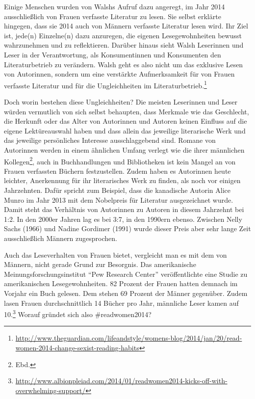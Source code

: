 \documentclass[a4paper,
fontsize=11pt,
oneside,
numbers=noperiodatend,
parskip=half-,
bibliography=totoc,
final
]{scrartcl}
\begin{document}
Einige Menschen wurden von Walshs Aufruf dazu angeregt, im Jahr 2014
ausschließlich von Frauen verfasste Literatur zu lesen. Sie selbst
erklärte hingegen, dass sie 2014 auch von Männern verfasste Literatur
lesen wird. Ihr Ziel ist, jede(n) Einzelne(n) dazu anzuregen, die
eigenen Lesegewohnheiten bewusst wahrzunehmen und zu reflektieren.
Darüber hinaus sieht Walsh Leserinnen und Leser in der Verantwortung,
als Konsumentinnen und Konsumenten den Literaturbetrieb zu verändern.
Walsh geht es also nicht um das exklusive Lesen von Autorinnen, sondern
um eine verstärkte Aufmerksamkeit für von Frauen verfasste Literatur und
für die Ungleichheiten im Literaturbetrieb.\footnote{\url{http://www.theguardian.com/lifeandstyle/womens-blog/2014/jan/20/read-women-2014-change-sexist-reading-habits}}

Doch worin bestehen diese Ungleichheiten? Die meisten Leserinnen und
Leser würden vermutlich von sich selbst behaupten, dass Merkmale wie das
Geschlecht, die Herkunft oder das Alter von Autorinnen und Autoren
keinen Einfluss auf die eigene Lektüreauswahl haben und dass allein das
jeweilige literarische Werk und das jeweilige persönliches Interesse
ausschlaggebend sind. Romane von Autorinnen werden in einem ähnlichen
Umfang verlegt wie die ihrer männlichen Kollegen\footnote{Ebd.}, auch in
Buchhandlungen und Bibliotheken ist kein Mangel an von Frauen verfassten
Büchern festzustellen. Zudem haben es Autorinnen heute leichter,
Anerkennung für ihr literarisches Werk zu finden, als noch vor einigen
Jahrzehnten. Dafür spricht zum Beispiel, dass die kanadische Autorin
Alice Munro im Jahr 2013 mit dem Nobelpreis für Literatur ausgezeichnet
wurde. Damit steht das Verhältnis von Autorinnen zu Autoren in diesem
Jahrzehnt bei 1:2. In den 2000er Jahren lag es bei 3:7, in den 1990ern
ebenso. Zwischen Nelly Sachs (1966) und Nadine Gordimer (1991) wurde
dieser Preis aber sehr lange Zeit ausschließlich Männern zugesprochen.

Auch das Leseverhalten von Frauen bietet, vergleicht man es mit dem von
Männern, nicht gerade Grund zur Besorgnis. Das amerikanische
Meinungsforschungsinstitut \enquote{Pew Research Center} veröffentlichte
eine Studie zu amerikanischen Lesegewohnheiten. 82 Prozent der Frauen
hatten demnach im Vorjahr ein Buch gelesen. Dem stehen 69 Prozent der
Männer gegenüber. Zudem lasen Frauen durchschnittlich 14 Bücher pro
Jahr, männliche Leser kamen auf 10.\footnote{\url{http://www.albionpleiad.com/2014/01/readwomen2014-kicks-off-with-overwhelming-support/}}
Worauf gründet sich also \#readwomen2014?~
\end{document}
